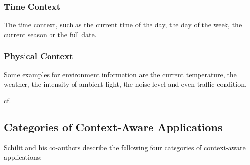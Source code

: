 \subsubsection*{Time Context}

The time context, such as the current time of the day, the day of the week, the current season or the full date. 

\subsubsection*{Physical Context}

Some examples for environment information are the current temperature, the weather, the intensity of ambient light, the noise level and even traffic condition.

cf. \cite{distributed-cas}


\subsection{Categories of Context-Aware Applications}

Schilit and his co-authors describe the following four categories of context-aware applications:

